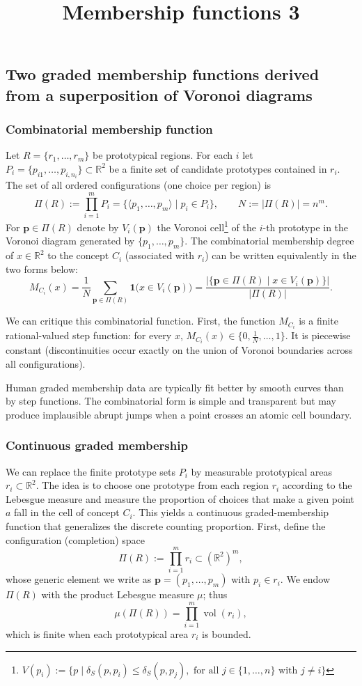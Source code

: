 \documentclass[11pt]{article}
\title{Membership functions 3}
\begin{document}
\subsection{Two graded membership functions derived from a superposition of Voronoi diagrams}

\subsubsection*{Combinatorial membership function}
Let \(R=\{r_1,\dots,r_m\}\) be prototypical regions. For each \(i\) let \(P_i=\{p_{i1},\dots,p_{i,n_i}\}\subset\mathbb{R}^2\) be a finite set of candidate prototypes contained in \(r_i\). The set of all ordered configurations (one choice per region) is
\[
\Pi(R):=\prod_{i=1}^m P_i=\{\langle p_1,\dots,p_m\rangle \mid p_i\in P_i\},
\qquad N:=|\Pi(R)|= n^m.
\]
For \(\mathbf p\in\Pi(R)\) denote by \(V_i(\mathbf p)\) the Voronoi cell\footnote{$V(p_i) := \{p \mid \delta_S(p, p_i) \le \delta_S(p, p_j), \text{ for all } j \in \{1, \ldots, n\} \text{ with } j \ne i\}$} of the \(i\)-th prototype in the Voronoi diagram generated by \(\{p_1,\dots,p_m\}\). The combinatorial membership degree of \(x\in\mathbb{R}^2\) to the concept \(C_i\) (associated with \(r_i\)) can be written equivalently in the two forms below:
\[
M_{C_i}(x)
= \frac{1}{N}\sum_{\mathbf p\in\Pi(R)} \mathbf{1}\big(x\in V_i(\mathbf p)\big)
= \frac{\big|\{\mathbf p\in\Pi(R)\mid x\in V_i(\mathbf p)\}\big|}{|\Pi(R)|}.
\]

We can critique this combinatorial function.
First, the function \(M_{C_i}\) is a finite rational-valued step function: for every \(x\), \(M_{C_i}(x)\in\{0,\frac{1}{N},\dots,1\}\). It is piecewise constant (discontinuities occur exactly on the union of Voronoi boundaries across all configurations).

Human graded membership data are typically fit better by smooth curves than by step functions. The combinatorial form is simple and transparent but may produce implausible abrupt jumps when a point crosses an atomic cell boundary.

\subsubsection*{Continuous graded membership}
We can replace the finite prototype sets \(P_i\) by measurable prototypical areas \(r_i\subset\mathbb{R}^2\). The idea is to choose one prototype from each region \(r_i\) according to the Lebesgue measure and measure the proportion of choices that make a given point \(a\) fall in the cell of concept \(C_i\). This yields a continuous graded-membership function that generalizes the discrete counting proportion.
First, define the configuration (completion) space
\[
\Pi(R) := \prod_{i=1}^m r_i \subset (\mathbb{R}^2)^m,
\]
whose generic element we write as \(\mathbf p=(p_1,\dots,p_m)\) with \(p_i\in r_i\). We endow \(\Pi(R)\) with the product Lebesgue measure \(\mu\); thus
\[
\mu(\Pi(R)) = \prod_{i=1}^m \operatorname{vol}(r_i),
\]
which is finite when each prototypical area \(r_i\) is bounded.
\end{document}
